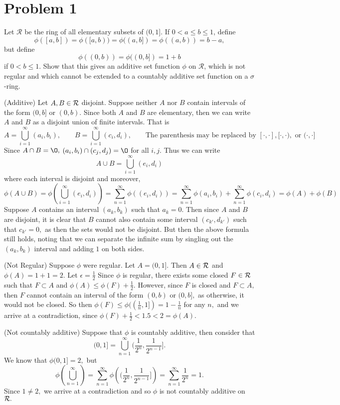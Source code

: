 \documentclass[11pt]{article}
\renewcommand{\emptyset}{\O}
\begin{document}
	
	
	\psetheader

\section*{Problem 1}
\begin{problem}
    Let $\mathcal{R}$ be the ring of all elementary subsets of $(0, 1]$. If $0 < a \leq b \leq 1$, define
\[
\phi([a, b]) = \phi([a, b)) = \phi((a, b]) = \phi((a, b)) = b - a,
\]
but define
\[
\phi((0, b)) = \phi((0, b]) = 1 + b
\]
if $0 < b \leq 1$. Show that this gives an additive set function $\phi$ on $\mathcal{R}$, which is not regular and which cannot be extended to a countably additive set function on a $\sigma$-ring.
\end{problem}
\begin{solution}
    (Additive) Let $A, B \in \cal R$ disjoint. Suppose neither $A$ nor $B$ contain intervals of the form $(0,b]$ or $(0,b).$ Since both $A$ and $B$ are elementary, then we can write $A$ and $B$ as a disjoint union of finite intervals. That is \[A = \bigcup_{i=1}^\infty (a_i, b_i), \qquad B = \bigcup_{i=1}^\infty (c_i, d_i), \qquad \text{The parenthesis may be replaced by $[\cdot,\cdot], [\cdot,\cdot),$ or $(\cdot,\cdot]$}\] Since $A \cap B  = \emptyset,$ $(a_i, b_i) \cap (c_j, d_j) = \emptyset$ for all $i,j.$ Thus we can write 
    \[A \cup B = \bigcup_{i=1}^\infty (e_i, d_i)\] where each interval is disjoint and moreover, 
    \[\phi(A \cup B) =\phi\left( \bigcup_{i=1}^\infty (e_i, d_i)\right) = \sum_{n=1}^\infty \phi((e_i, d_i)) = \sum_{n=1}^\infty \phi(a_i, b_i) + \sum_{n=1}^\infty \phi(c_i, d_i) = \phi(A) + \phi(B)\]
    Suppose $A$ contains an interval $(a_k,b_k)$ such that $a_k = 0.$ Then since $A$ and $B$ are disjoint, it is clear that $B$ cannot also contain some interval $(c_{k'}, d_{k'})$ such that $c_{k'} = 0,$ as then the sets would not be disjoint. But then the above formula still holds, noting that we can separate the infinite sum by singling out the $(a_k, b_k)$ interval and adding $1$ on both sides. 

    (Not Regular) Suppose $\phi$ were regular. Let $A = (0, 1].$ Then $A \in \cal R$ and $\phi(A) = 1 + 1 = 2.$ Let $\epsilon = \frac{1}{2}$ Since $\phi$ is regular, there exists some closed $F \in \cal R$ such that $F \subset A$ and $\phi(A) \leq \phi(F) + \frac{1}{2}.$ However, since $F$ is closed and $F\subset A,$ then $F$ cannot contain an interval of the form $(0,b)$ or $(0,b],$ as otherwise, it would not be closed. So then $\phi(F) \leq \phi((\frac{1}{n}, 1]) = 1-\frac{1}{n}$ for any $n,$ and we arrive at a contradiction, since $\phi(F) + \frac{1}{2} < 1.5 < 2 = \phi(A).$  

    (Not countably additive) Suppose that $\phi$ is countably additive, then consider that 
    \[(0,1] = \bigcup_{n=1}^\infty (\frac{1}{2^n},\frac{1}{2^{n-1}}].\] We know that $\phi(0,1] = 2,$ but 
    \[\phi\left(\bigcup_{n=1}^\infty \right) = \sum_{n=1}^\infty \phi\left((\frac{1}{2^n},\frac{1}{2^{n-1}}]\right) = \sum_{n=1}^\infty \frac{1}{2^n} = 1.\] Since $1\neq 2,$ we arrive at a contradiction and so $\phi$ is not countably additive on $\cal R.$
\end{solution}
\end{document}
